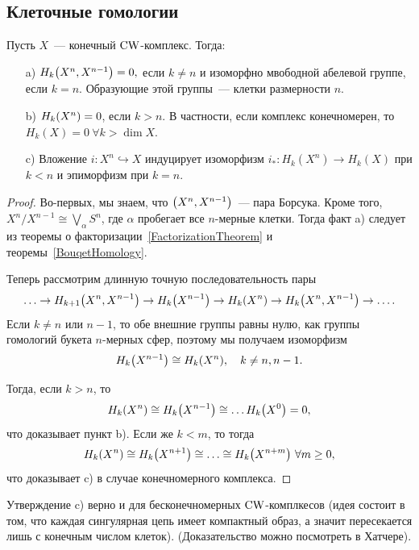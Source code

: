     \subsection{Клеточные гомологии}

    \begin{lemma}
        Пусть $X$~--- конечный $\CW$-комплекс. Тогда:
        \begin{enumerate}
            \item[a)]\label{a} $H_{k}\lr*{X^n, X^{n - 1}} = 0,$ если $k \neq n$ и изоморфно мвободной абелевой группе, если $k = n$.
            Образующие этой группы~--- клетки размерности $n$.
            \item[b)] $H_{k}\lr*{X^n} = 0$, если $k > n$. В частности, если комплекс конечномерен, то $H_{k}(X) = 0 \ \forall k > \dim{X}$.
            \item[c)] Вложение $i\colon X^n \hookrightarrow X$ индуцирует изоморфизм $i_{*}\colon H_{k}(X^n) \to H_{k}(X)$ при $k < n$ и эпиморфизм
            при $k = n$.
        \end{enumerate}
    \end{lemma}
    
    \begin{proof}
        Во-первых, мы знаем, что $\lr*{X^n, X^{n - 1}}$~--- пара Борсука. Кроме того, $X^n/X^{n - 1} \cong \bigvee_{\alpha} S^n$, где $\alpha$ пробегает все $n$-мерные клетки.
        Тогда факт a) следует из теоремы о факторизации~\ref{FactorizationTheorem} и теоремы~\ref{BouqetHomology}.

        Теперь рассмотрим длинную точную последовательность пары
        \[ \ldots \to H_{k + 1}\lr*{X^n, X^{n - 1}} \to H_{k}\lr*{X^{n - 1}} \to H_{k}\lr*{X^n} \to H_{k}\lr*{X^n, X^{n - 1}} \to \ldots. \]
        Если $k \neq n$ или $n - 1$, то обе внешние группы равны нулю, как группы гомологий букета $n$-мерных сфер, поэтому мы получаем изоморфизм
        \[ H_{k}\lr*{X^{n - 1}} \cong H_{k}\lr*{X^n}, \quad k \neq n, n - 1.\]

        Тогда, если $k > n$, то
        \[ H_{k}\lr*{X^n} \cong H_{k}\lr*{X^{n - 1}} \cong \ldots H_{k}\lr*{X^0} = 0, \]
        что доказывает пункт b). Если же $k < m$, то тогда
        \[ H_{k}\lr*{X^n} \cong H_{k}\lr*{X^{n + 1}} \cong \ldots \cong H_{k}\lr*{X^{n + m}} \ \forall m \ge 0,\]
        что доказывает c) в случае конечномерного комплекса. 
    \end{proof}
    
    \begin{remark}
       Утверждение c) верно и для бесконечномерных $\CW$-комплкесов (идея состоит в том, что каждая сингулярная цепь имеет компактный образ, а значит пересекается лишь с конечным числом клеток).
       (Доказательство можно посмотреть в Хатчере).
    \end{remark}

